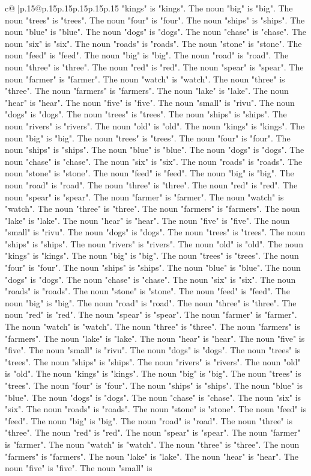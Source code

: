 \documentclass{article}
\begin{document}
{\begin{supertabular}{c@{$\;$}|p{.15\linewidth}@{}p{.15\linewidth}p{.15\linewidth}p{.15\linewidth}p{.15\linewidth}p{.15\linewidth}}
{{{"kings" is "kings". The noun "big" is "big". The noun "trees" is "trees". The noun "four" is "four". The noun "ships" is "ships". The noun "blue" is "blue". The noun "dogs" is "dogs". The noun "chase" is "chase". The noun "six" is "six". The noun "roads" is "roads". The noun "stone" is "stone". The noun "feed" is "feed". The noun "big" is "big". The noun "road" is "road". The noun "three" is "three". The noun "red" is "red". The noun "spear" is "spear". The noun "farmer" is "farmer". The noun "watch" is "watch". The noun "three" is "three". The noun "farmers" is "farmers". The noun "lake" is "lake". The noun "hear" is "hear". The noun "five" is "five". The noun "small" is "rivu". The noun "dogs" is "dogs". The noun "trees" is "trees". The noun "ships" is "ships". The noun "rivers" is "rivers". The noun "old" is "old". The noun "kings" is "kings". The noun "big" is "big". The noun "trees" is "trees". The noun "four" is "four". The noun "ships" is "ships". The noun "blue" is "blue". The noun "dogs" is "dogs". The noun "chase" is "chase". The noun "six" is "six". The noun "roads" is "roads". The noun "stone" is "stone". The noun "feed" is "feed". The noun "big" is "big". The noun "road" is "road". The noun "three" is "three". The noun "red" is "red". The noun "spear" is "spear". The noun "farmer" is "farmer". The noun "watch" is "watch". The noun "three" is "three". The noun "farmers" is "farmers". The noun "lake" is "lake". The noun "hear" is "hear". The noun "five" is "five". The noun "small" is "rivu". The noun "dogs" is "dogs". The noun "trees" is "trees". The noun "ships" is "ships". The noun "rivers" is "rivers". The noun "old" is "old". The noun "kings" is "kings". The noun "big" is "big". The noun "trees" is "trees". The noun "four" is "four". The noun "ships" is "ships". The noun "blue" is "blue". The noun "dogs" is "dogs". The noun "chase" is "chase". The noun "six" is "six". The noun "roads" is "roads". The noun "stone" is "stone". The noun "feed" is "feed". The noun "big" is "big". The noun "road" is "road". The noun "three" is "three". The noun "red" is "red". The noun "spear" is "spear". The noun "farmer" is "farmer". The noun "watch" is "watch". The noun "three" is "three". The noun "farmers" is "farmers". The noun "lake" is "lake". The noun "hear" is "hear". The noun "five" is "five". The noun "small" is "rivu". The noun "dogs" is "dogs". The noun "trees" is "trees". The noun "ships" is "ships". The noun "rivers" is "rivers". The noun "old" is "old". The noun "kings" is "kings". The noun "big" is "big". The noun "trees" is "trees". The noun "four" is "four". The noun "ships" is "ships". The noun "blue" is "blue". The noun "dogs" is "dogs". The noun "chase" is "chase". The noun "six" is "six". The noun "roads" is "roads". The noun "stone" is "stone". The noun "feed" is "feed". The noun "big" is "big". The noun "road" is "road". The noun "three" is "three". The noun "red" is "red". The noun "spear" is "spear". The noun "farmer" is "farmer". The noun "watch" is "watch". The noun "three" is "three". The noun "farmers" is "farmers". The noun "lake" is "lake". The noun "hear" is "hear". The noun "five" is "five". The noun "small" is }}}
\end{supertabular}}
\end{document}
